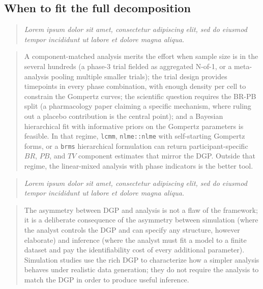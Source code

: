 \documentclass[
  11pt,
]{article}
\newenvironment{rgt}{%
  \begin{quote}\small\itshape\color[RGB]{20,60,160}}{%
  \end{quote}}
\newenvironment{orig}{%
  \begin{quote}\normalsize\color[gray]{0.55}}{%
  \end{quote}}
\begin{document}
\subsection{When to fit the full decomposition}\label{when-to-fit-the-full-decomposition}

\begin{rgt}
Lorem ipsum dolor sit amet, consectetur adipiscing elit, sed do eiusmod tempor incididunt ut labore et dolore magna aliqua.

\end{rgt}

\begin{orig}
A component-matched analysis merits the effort when sample size
is in the several hundreds (a phase-3 trial fielded as
aggregated N-of-1, or a meta-analysis pooling multiple smaller
trials); the trial design provides timepoints in every phase
combination, with enough density per cell to constrain the
Gompertz curves; the scientific question requires the BR-PB
split (a pharmacology paper claiming a specific mechanism, where
ruling out a placebo contribution is the central point); and a
Bayesian hierarchical fit with informative priors on the
Gompertz parameters is feasible. In that regime, \texttt{lcmm},
\texttt{nlme::nlme} with self-starting Gompertz forms, or a
\texttt{brms} hierarchical formulation can return
participant-specific \(BR\), \(PB\), and \(TV\) component estimates
that mirror the DGP. Outside that regime, the linear-mixed
analysis with phase indicators is the better tool.

\end{orig}

\begin{rgt}
Lorem ipsum dolor sit amet, consectetur adipiscing elit, sed do eiusmod tempor incididunt ut labore et dolore magna aliqua.

\end{rgt}

\begin{orig}
The asymmetry between DGP and analysis is not a flaw of the
framework; it is a deliberate consequence of the asymmetry
between simulation (where the analyst controls the DGP and can
specify any structure, however elaborate) and inference (where
the analyst must fit a model to a finite dataset and pay the
identifiability cost of every additional parameter). Simulation
studies use the rich DGP to characterize how a simpler analysis
behaves under realistic data generation; they do not require the
analysis to match the DGP in order to produce useful inference.

\end{orig}
\end{document}

